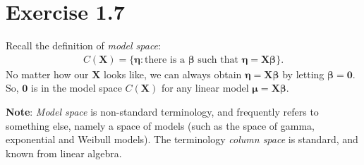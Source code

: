 \section*{Exercise 1.7}
Recall the definition of \textit{model space}: 
\begin{align*}
C(\bm{X}) = \{\bm{\eta}: \mbox{there is a $\bm{\beta}$ such that $\bm{\eta} = \bm{X}\bm{\beta}$}\}.
\end{align*}
No matter how our $\bm{X}$ looks like, we can always obtain $\bm{\eta} = \bm{X}\bm{\beta}$ by letting $\bm{\beta} = \bm{0}$. So, $\bm{0}$ is in the model space $C(\bm{X})$ for any linear model $\bm{\mu} = \bm{X}\bm{\beta}.$

\textbf{Note}: \textit{Model space} is non-standard terminology, and frequently refers to something else, namely a space of models (such as the space of gamma, exponential and Weibull models). The terminology \textit{column space} is standard, and known from linear algebra.
